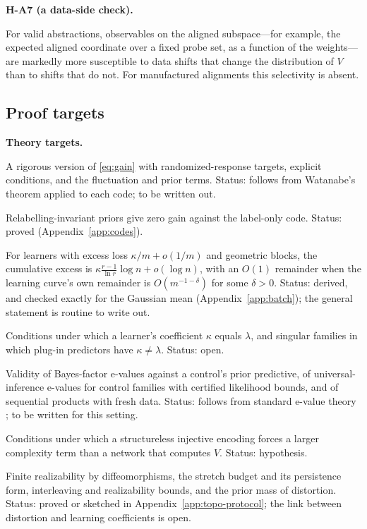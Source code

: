 \documentclass[11pt,a4paper]{article}
\newenvironment{hypbox}[1]{%
  \def\FrameCommand{{\color{chyp}\vrule width 1.6pt}\hspace{8pt}}%
  \MakeFramed{\advance\hsize-\width\FrameRestore}%
  \noindent\textbf{#1}\par\smallskip\noindent\ignorespaces}{\endMakeFramed}
\newenvironment{keybox}[1]{%
  \def\FrameCommand{{\color{ccalc}\vrule width 1.6pt}\hspace{8pt}}%
  \MakeFramed{\advance\hsize-\width\FrameRestore}%
  \noindent\textbf{#1}\par\smallskip\noindent\ignorespaces}{\endMakeFramed}
\begin{document}
\begin{hypbox}{H-A7 (a data-side check).}
For valid abstractions, observables on the aligned subspace---for example,
the expected aligned coordinate over a fixed probe set, as a function of
the weights---are markedly more susceptible to data shifts that change the
distribution of $V$ than to shifts that do not. For manufactured alignments
this selectivity is absent.
\end{hypbox}

\subsection{Proof targets}

\begin{keybox}{Theory targets.}
\begin{description}[style=nextline,leftmargin=1.2em]
\item[T1, decomposition on fixed targets.] A rigorous version of
\eqref{eq:gain} with randomized-response targets, explicit conditions, and
the fluctuation and prior terms. Status: follows from Watanabe's theorem
applied to each code; to be written out.
\item[T2, label-only control.] Relabelling-invariant priors give zero gain
against the label-only code. Status: proved (Appendix~\ref{app:codes}).
\item[T3, batching factor.] For learners with excess loss
$\kappa/m+o(1/m)$ and geometric blocks, the cumulative excess is $\kappa\frac{r-1}{\ln r}\log n+o(\log n)$, with an $O(1)$ remainder when the learning curve's own remainder is $O(m^{-1-\delta})$ for some $\delta>0$. Status: derived, and checked exactly
for the Gaussian mean (Appendix~\ref{app:batch}); the general statement is
routine to write out.
\item[T4, learner coefficients.] Conditions under which a learner's
coefficient $\kappa$ equals $\lambda$, and singular families in which
plug-in predictors have $\kappa\neq\lambda$. Status: open.
\item[T5, tests.] Validity of Bayes-factor e-values against a control's
prior predictive, of universal-inference e-values for control families
with certified likelihood bounds, and of sequential products with fresh
data. Status: follows from standard e-value theory
\cite{grunwald2024safe,wasserman2020}; to be written for this setting.
\item[T6, untrained-network control.] Conditions under which a
structureless injective encoding forces a larger complexity term than a
network that computes $V$. Status: hypothesis.
\item[T7, metric certificates.] Finite realizability by diffeomorphisms, the
stretch budget and its persistence form, interleaving and realizability
bounds, and the prior mass of distortion. Status: proved or sketched in
Appendix~\ref{app:topo-protocol}; the link between distortion and learning
coefficients is open.
\end{description}
\end{keybox}
\end{document}
